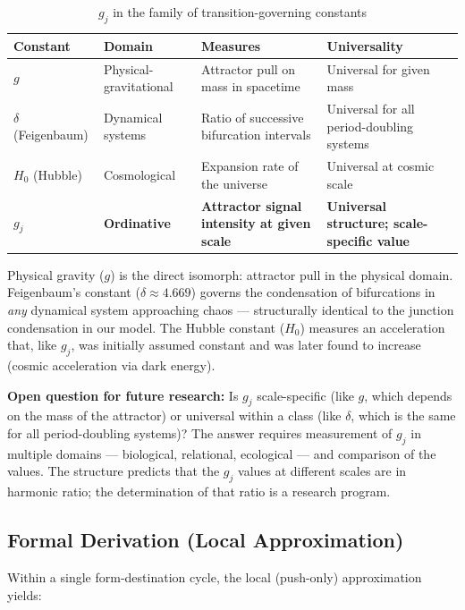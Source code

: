 \documentclass[12pt,a4paper]{article}
\newcommand{\gj}{g_j}
\begin{document}
\begin{table}[H]
\centering
\caption{$\gj$ in the family of transition-governing constants}
\label{tab:gj_family}
\begin{tabular}{@{}p{2.5cm}p{3cm}p{3.5cm}p{3.5cm}@{}}
\toprule
\textbf{Constant} & \textbf{Domain} & \textbf{Measures} & \textbf{Universality} \\
\midrule
$g$ & Physical-gravitational & Attractor pull on mass in spacetime & Universal for given mass \\[0.3em]
$\delta$ (Feigenbaum) & Dynamical systems & Ratio of successive bifurcation intervals & Universal for all period-doubling systems \\[0.3em]
$H_0$ (Hubble) & Cosmological & Expansion rate of the universe & Universal at cosmic scale \\[0.3em]
$\gj$ & \textbf{Ordinative} & \textbf{Attractor signal intensity at given scale} & \textbf{Universal structure; scale-specific value} \\
\bottomrule
\end{tabular}
\end{table}

Physical gravity ($g$) is the direct isomorph: attractor pull in the physical domain. Feigenbaum's constant ($\delta \approx 4.669$) governs the condensation of bifurcations in \emph{any} dynamical system approaching chaos --- structurally identical to the junction condensation in our model. The Hubble constant ($H_0$) measures an acceleration that, like $\gj$, was initially assumed constant and was later found to increase (cosmic acceleration via dark energy).

\textbf{Open question for future research:} Is $\gj$ scale-specific (like $g$, which depends on the mass of the attractor) or universal within a class (like $\delta$, which is the same for all period-doubling systems)? The answer requires measurement of $\gj$ in multiple domains --- biological, relational, ecological --- and comparison of the values. The structure predicts that the $\gj$ values at different scales are in harmonic ratio; the determination of that ratio is a research program.

\subsection{Formal Derivation (Local Approximation)}\label{subsec:gj_formal}

Within a single form-destination cycle, the local (push-only) approximation yields:
\end{document}
